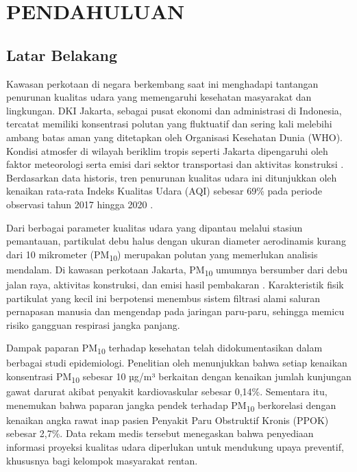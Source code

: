 \cleardoublepage
\chapter{PENDAHULUAN}
\label{chap:pendahuluan}

\section{Latar Belakang}

Kawasan perkotaan di negara berkembang saat ini menghadapi tantangan penurunan kualitas udara yang memengaruhi kesehatan masyarakat dan lingkungan. DKI Jakarta, sebagai pusat ekonomi dan administrasi di Indonesia, tercatat memiliki konsentrasi polutan yang fluktuatif dan sering kali melebihi ambang batas aman yang ditetapkan oleh Organisasi Kesehatan Dunia (WHO). Kondisi atmosfer di wilayah beriklim tropis seperti Jakarta dipengaruhi oleh faktor meteorologi serta emisi dari sektor transportasi dan aktivitas konstruksi \autocite{firdaus2023jakarta}. Berdasarkan data historis, tren penurunan kualitas udara ini ditunjukkan oleh kenaikan rata-rata Indeks Kualitas Udara (AQI) sebesar 69\% pada periode observasi tahun 2017 hingga 2020 \autocite{aulia2024air}.

Dari berbagai parameter kualitas udara yang dipantau melalui stasiun pemantauan, partikulat debu halus dengan ukuran diameter aerodinamis kurang dari 10 mikrometer (PM\textsubscript{10}) merupakan polutan yang memerlukan analisis mendalam. Di kawasan perkotaan Jakarta, PM\textsubscript{10} umumnya bersumber dari debu jalan raya, aktivitas konstruksi, dan emisi hasil pembakaran \autocite{carb2025inhalable}. Karakteristik fisik partikulat yang kecil ini berpotensi menembus sistem filtrasi alami saluran pernapasan manusia dan mengendap pada jaringan paru-paru, sehingga memicu risiko gangguan respirasi jangka panjang.

Dampak paparan PM\textsubscript{10} terhadap kesehatan telah didokumentasikan dalam berbagai studi epidemiologi. Penelitian oleh \textcite{zhang2021association} menunjukkan bahwa setiap kenaikan konsentrasi PM\textsubscript{10} sebesar 10 µg/m³ berkaitan dengan kenaikan jumlah kunjungan gawat darurat akibat penyakit kardiovaskular sebesar 0,14\%. Sementara itu, \textcite{kyung2020particulate} menemukan bahwa paparan jangka pendek terhadap PM\textsubscript{10} berkorelasi dengan kenaikan angka rawat inap pasien Penyakit Paru Obstruktif Kronis (PPOK) sebesar 2,7\%. Data rekam medis tersebut menegaskan bahwa penyediaan informasi proyeksi kualitas udara diperlukan untuk mendukung upaya preventif, khususnya bagi kelompok masyarakat rentan.

